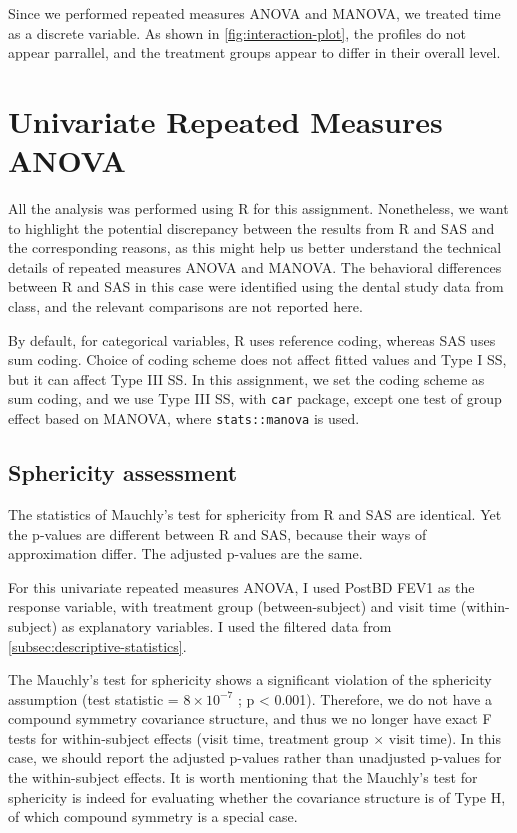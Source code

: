 \documentclass[12pt]{article}
\begin{document}
Since we performed repeated measures ANOVA and MANOVA, 
we treated time
as a discrete variable.
As shown in \cref{fig:interaction-plot}, the profiles do not appear parrallel,
and the treatment groups appear to differ in their overall level.

\section{Univariate Repeated Measures ANOVA}

All the analysis was performed using R for this assignment.
Nonetheless, we want to highlight the potential discrepancy between
the results from R and SAS and the corresponding reasons, 
as this might help us better
understand the technical details of repeated measures
ANOVA and MANOVA. The behavioral differences between R and SAS 
in this case
were identified using the dental study data from class, 
and the relevant comparisons are not reported here.

By default, for categorical variables, R uses reference coding, whereas SAS uses sum coding.
Choice of coding scheme does not affect fitted values and Type I SS, but it can affect Type III SS.
In this assignment, we set the coding scheme as sum coding, and we use Type III SS, with \texttt{car} package,
except one test of group effect based on MANOVA, where \verb|stats::manova| is used.

\subsection{Sphericity assessment}


The statistics of Mauchly's test for sphericity from R and SAS are identical.
Yet the p-values are different between R and SAS, because
their ways of approximation differ. The adjusted p-values are the same.

For this univariate repeated measures ANOVA, I used PostBD FEV1
as the response variable, with treatment group (between-subject)
and visit time (within-subject) as
explanatory variables.
I used the filtered data from \cref{subsec:descriptive-statistics}.

The Mauchly's test for sphericity shows a significant
violation of the sphericity assumption 
(test statistic = $8 \times 10^{-7}$ ; p < 0.001).
Therefore, we do not have a compound symmetry covariance structure,
and thus we no longer have exact F tests for within-subject effects (visit time,
treatment group $\times$ visit time). In this case, we should
report the adjusted p-values rather than unadjusted p-values
for the within-subject effects.
It is worth mentioning that the Mauchly's test for sphericity
is indeed for evaluating whether the covariance structure is
of Type H, of which compound symmetry is a special case. 
\end{document}
